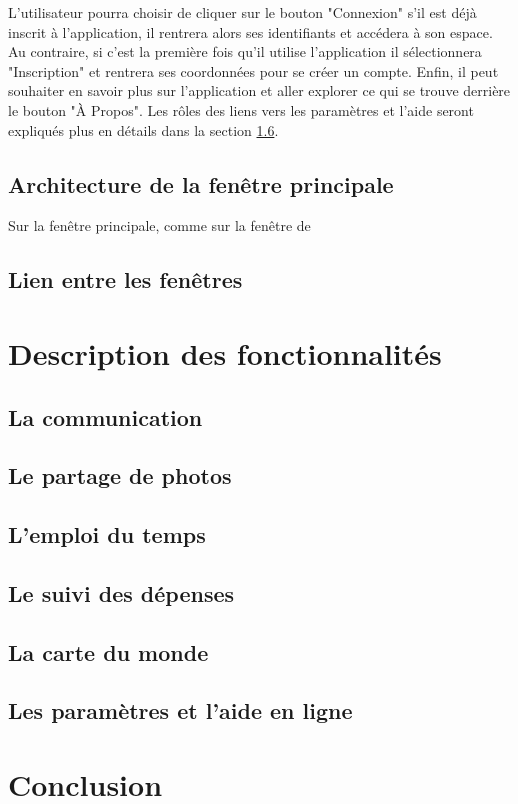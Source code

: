 \documentclass[11pt]{article}
\begin{document}
L'utilisateur pourra choisir de cliquer sur le bouton "Connexion" s'il est déjà inscrit à l'application, il rentrera alors ses identifiants et accédera à son espace. Au contraire, si c'est la première fois qu'il utilise l'application il sélectionnera "Inscription" et rentrera ses coordonnées pour se créer un compte. Enfin, il peut souhaiter en savoir plus sur l'application et aller explorer ce qui se trouve derrière le bouton "À Propos".  Les rôles des liens vers les paramètres et l'aide seront expliqués plus en détails dans la section \ref{par:aide}.

\subsection{Architecture de la fenêtre principale}
Sur la fenêtre principale, comme sur la fenêtre de 
\subsection{Lien entre les fenêtres}

\newpage
\section{Description des fonctionnalités}
\subsection{La communication}
\subsection{Le partage de photos}
\subsection{L'emploi du temps}
\subsection{Le suivi des dépenses}
\subsection{La carte du monde}
\subsection{Les paramètres et l'aide en ligne}\label{par:aide}

\newpage
\section*{Conclusion}
\end{document}
